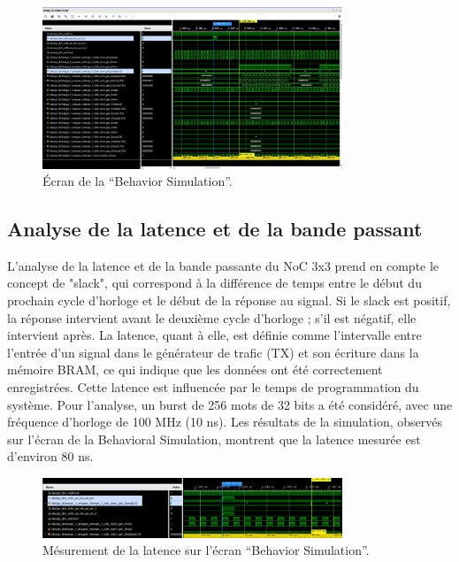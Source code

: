\documentclass[../CSC_5RO07_TA.tex]{subfiles}
\begin{document}
\begin{figure}[H]
    \centering
    \includegraphics[width=0.8\textwidth]{./images/behaviorSim.png}
    \caption{Écran de la ``Behavior Simulation''.}
    \label{BS20ns}
\end{figure}


\subsection{Analyse de la latence et de la bande passant}

L’analyse de la latence et de la bande passante du NoC 3x3 prend en compte le concept de "slack", qui correspond à la différence de temps entre le début du prochain cycle d’horloge et le début de la réponse au signal. Si le slack est positif, la réponse intervient avant le deuxième cycle d’horloge ; s’il est négatif, elle intervient après. La latence, quant à elle, est définie comme l’intervalle entre l’entrée d’un signal dans le générateur de trafic (TX) et son écriture dans la mémoire BRAM, ce qui indique que les données ont été correctement enregistrées. Cette latence est influencée par le temps de programmation du système. Pour l’analyse, un burst de 256 mots de 32 bits a été considéré, avec une fréquence d’horloge de 100 MHz (10 ns). Les résultats de la simulation, observés sur l’écran de la Behavioral Simulation, montrent que la latence mesurée est d’environ 80 ns.

\begin{figure}[H]
    \centering
    \includegraphics[width=0.8\textwidth]{./images/latencia10ns.png}
    \caption{Mésurement de la latence sur l'écran ``Behavior Simulation''.}
    \label{BS10ns}
\end{figure}
\end{document}
